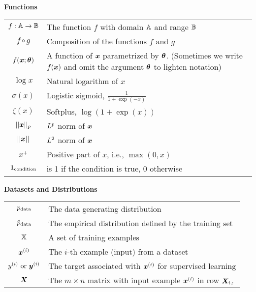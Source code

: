 \vspace{\notationgap}
\begin{minipage}{\textwidth}
\centerline{\bf Functions}
\bgroup
\def\arraystretch{1.5}
\begin{tabular}{cp{3.25in}}
$\displaystyle f: {\mathbb{A}} \rightarrow {\mathbb{B}}$ & The function $f$ with domain ${\mathbb{A}}$ and range ${\mathbb{B}}$\\
$\displaystyle f \circ g $ & Composition of the functions $f$ and $g$ \\
  $\displaystyle f({\bm{x}} ; {\bm{\theta}}) $ & A function of ${\bm{x}}$ parametrized by ${\bm{\theta}}$.
  (Sometimes we write $f({\bm{x}})$ and omit the argument ${\bm{\theta}}$ to lighten notation) \\
$\displaystyle \log x$ & Natural logarithm of $x$ \\
$\displaystyle \sigma(x)$ & Logistic sigmoid, $\displaystyle \frac{1} {1 + \exp(-x)}$ \\
$\displaystyle \zeta(x)$ & Softplus, $\log(1 + \exp(x))$ \\
$\displaystyle || {\bm{x}} ||_p $ & $L^p$ norm of ${\bm{x}}$ \\
$\displaystyle || {\bm{x}} || $ & $L^2$ norm of ${\bm{x}}$ \\
$\displaystyle x^+$ & Positive part of $x$, i.e., $\max(0,x)$\\
$\displaystyle \bm{1}_\mathrm{condition}$ & is 1 if the condition is true, 0 otherwise\\
\end{tabular}
\egroup
{}
\end{minipage}



\vspace{\notationgap}
\begin{minipage}{\textwidth}
\centerline{\bf Datasets and Distributions}
\bgroup
\def\arraystretch{1.5}
\begin{tabular}{cp{3.25in}}
$\displaystyle p_{\rm{data}}$ & The data generating distribution\\
$\displaystyle \hat{p}_{\rm{data}}$ & The empirical distribution defined by the training set\\
$\displaystyle {\mathbb{X}}$ & A set of training examples\\
$\displaystyle {\bm{x}}^{(i)}$ & The $i$-th example (input) from a dataset\\
$\displaystyle y^{(i)}\text{ or }{\bm{y}}^{(i)}$ & The target associated with ${\bm{x}}^{(i)}$ for supervised learning\\
$\displaystyle {\bm{X}}$ & The $m \times n$ matrix with input example ${\bm{x}}^{(i)}$ in row ${\bm{X}}_{i,:}$\\
\end{tabular}
\egroup
\end{minipage}

\clearpage
